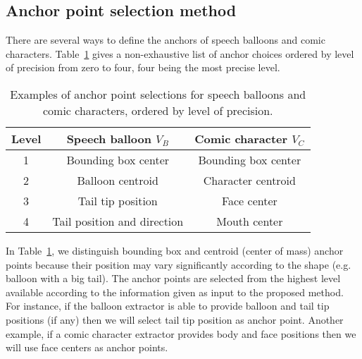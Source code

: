 \documentclass[conference]{IEEEtran}
\begin{document}
 

\subsection{Anchor point selection method} %
\label{sub:anchor_points_selection}

There are several ways to define the anchors of speech balloons and comic characters.
Table~\ref{tab:anchor_list} gives a non-exhaustive list of anchor choices ordered by level of precision from zero to four, four being the most precise level.
  \begin{table}[t]
    \normalsize

    \centering
    \caption{Examples of anchor point selections for speech balloons and comic characters, ordered by level of precision.}
    \begin{tabular}{|c|c|c|}
          \hline
        Level &  Speech balloon $V_B$  & Comic character $V_C$     \\
        \hline
        1   & Bounding box center   & Bounding box center \\
        \hline
        2   & Balloon centroid   & Character centroid \\
        \hline
        3   & Tail tip position & Face center  \\
        \hline
        4   & Tail position and direction & Mouth center  \\
        \hline
        \end{tabular}
    \label{tab:anchor_list}
  \end{table}%
In Table~\ref{tab:anchor_list}, we distinguish bounding box and centroid (center of mass) anchor points because their position may vary significantly according to the shape (e.g. balloon with a big tail).
The anchor points are selected from the highest level available according to the information given as input to the proposed method.
For instance, if the balloon extractor is able to provide balloon and tail tip positions (if any) then we will select tail tip position as anchor point.
Another example, if a comic character extractor provides body and face positions then we will use face centers as anchor points.
\end{document}
